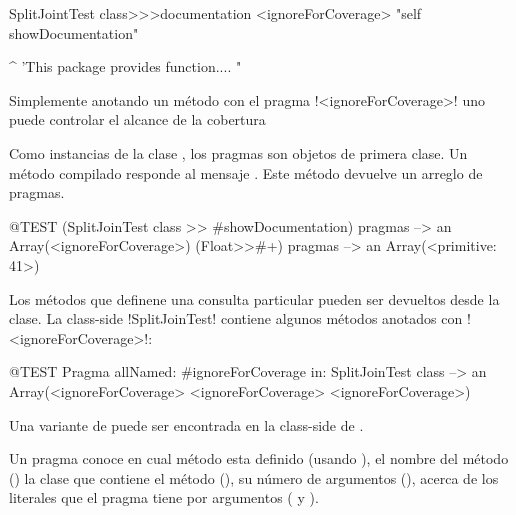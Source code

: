 \documentclass[a4paper,10pt,twoside]{book}
\begin{document}
\begin{code}{}
SplitJointTest class>>>documentation
        <ignoreForCoverage>
        "self showDocumentation"

        ^ 'This package provides function.... "
\end{code}

Simplemente anotando un m\'etodo con el pragma \ct!<ignoreForCoverage>! uno puede controlar el alcance de la cobertura


%


Como instancias de la clase , los pragmas son objetos de primera clase. Un m\'etodo compilado responde al mensaje . Este m\'etodo devuelve un arreglo de pragmas.

\begin{code}{@TEST}
(SplitJoinTest class >> #showDocumentation) pragmas
  --> an Array(<ignoreForCoverage>)
(Float>>#+) pragmas --> an Array(<primitive: 41>)
\end{code}


Los m\'etodos que definene una consulta particular pueden ser devueltos desde la clase. La class-side \ct!SplitJoinTest! contiene algunos m\'etodos anotados con \ct!<ignoreForCoverage>!:

\begin{code}{@TEST}
Pragma allNamed: #ignoreForCoverage in: SplitJoinTest class  --> an Array(<ignoreForCoverage> <ignoreForCoverage> <ignoreForCoverage>)
\end{code}

Una variante de  puede ser encontrada en la class-side de .

Un pragma conoce en cual m\'etodo esta definido (usando ), el nombre del m\'etodo () la clase que contiene el m\'etodo (), su n\'umero de argumentos (), acerca de los literales que el pragma tiene por argumentos ( y ).
\end{document}
